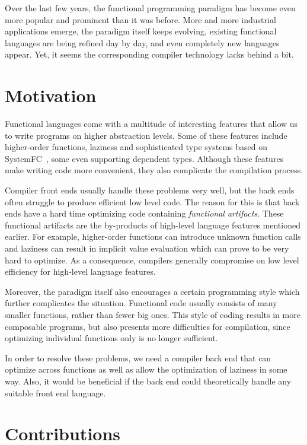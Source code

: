 \documentclass[main.tex]{subfiles}
\begin{document}
	
	Over the last few years, the functional programming paradigm has become even more popular and prominent than it was before. More and more industrial applications emerge, the paradigm itself keeps evolving, existing functional languages are being refined day by day, and even completely new languages appear. Yet, it seems the corresponding compiler technology lacks behind a bit.
	
	\section{Motivation}
	
	Functional languages come with a multitude of interesting features that allow us to write programs on higher abstraction levels. Some of these features include higher-order functions, laziness and sophisticated type systems based on SystemFC~\cite{systemfc}, some even supporting dependent types. Although these features make writing code more convenient, they also complicate the compilation process.
	
	Compiler front ends usually handle these problems very well, but the back ends often struggle to produce efficient low level code. The reason for this is that back ends have a hard time optimizing code containing \emph{functional artifacts}. These functional artifacts are the by-products of high-level language features mentioned earlier. For example, higher-order functions can introduce unknown function calls and laziness can result in implicit value evaluation which can prove to be very hard to optimize. As a consequence, compilers generally compromise on low level efficiency for high-level language features.
	
	Moreover, the paradigm itself also encourages a certain programming style which further complicates the situation. Functional code usually consists of many smaller functions, rather than fewer big ones. This style of coding results in more composable programs, but also presents more difficulties for compilation, since optimizing individual functions only is no longer sufficient. 
	
	In order to resolve these problems, we need a compiler back end that can optimize across functions as well as allow the optimization of laziness in some way. Also, it would be beneficial if the back end could theoretically handle any suitable front end language.
	
	\section{Contributions}
	
\end{document}
